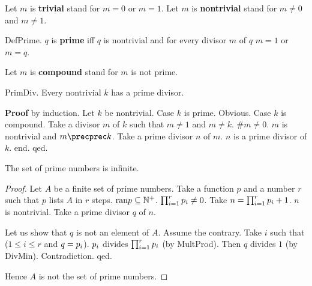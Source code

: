 Let $m$ is {\bf trivial} stand for $m = 0$ or $m = 1$.
Let $m$ is {\bf nontrivial} stand for $m \neq 0$ and $m \neq 1$.

\begin{definition} DefPrime.
$q$ is {\bf prime} iff $q$ is nontrivial and
for every divisor $m$ of $q$ $m = 1$ or $m = q$.
\end{definition}

Let $m$ is {\bf compound} stand for $m$ is not prime.

\begin{lemma} PrimDiv.
Every nontrivial $k$ has a prime divisor.
\end{lemma}
{\bf Proof} by induction.
Let $k$ be nontrivial.
Case $k$ is prime. Obvious.
Case $k$ is compound. 
Take a divisor $m$ of $k$ such that $m \neq 1$ and $m \neq k$.
#$m \neq 0$.
$m$ is nontrivial and $m \precprec k$.
Take a prime divisor $n$ of $m$.
$n$ is a prime divisor of $k$.
end.
qed.


\begin{theoremp}
The set of prime numbers is infinite.
\end{theoremp}
\begin{proof}
Let $A$ be a finite set of prime numbers.
Take a function $p$ and a number $r$ such that 
$p$ lists $A$ in $r$ steps.
$\text{ran} p \subseteq \NNplus$.
$\Product{p}{1}{r} \neq 0$.
Take $n=\Product{p}{1}{r}+1$.
$n$ is nontrivial.
Take a prime divisor $q$ of $n$.

Let us show that $q$ is not an element of $A$.
Assume the contrary.
Take $i$ such that ($1 \leq i \leq r$ and $q=\subfunc{p}{i}$).
$\subfunc{p}{i}$ divides $\Product{p}{1}{r}$ (by MultProd).
Then $q$ divides $1$ (by DivMin). 
Contradiction. qed.

Hence $A$ is not the set of prime numbers.
\end{proof}




